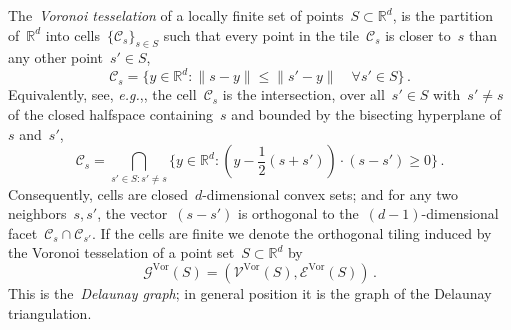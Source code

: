 \documentclass[12pt]{amsart}
\numberwithin{equation}{section}
\newcommand{\eg}{{\it e.g.}}
\newcommand*{\Rd}{\ensuremath{\mathbb{R}^d}}
\newcommand{\GVor}{\mathcal{G}^{\mathrm{Vor}}}
\newcommand{\VVor}{\mathcal{V}^{\mathrm{Vor}}}
\newcommand{\EVor}{\mathcal{E}^{\mathrm{Vor}}}
\begin{document}
The~\emph{Voronoi tesselation} of a locally finite set of points~$S \subset \Rd$, is the partition of~$\Rd$
into cells~$\{\mathcal{C}_s\}_{s \in S}$ such that every point in the tile~$\mathcal{C}_s$ is closer
to~$s$ than any other point~$s' \in S$, 
\[
\mathcal{C}_s = \{y \in \Rd: \|s - y\| \leq \|s' - y\| \quad \forall s' \in S  \} \, . 
\]
Equivalently, see, \eg ,\cite[Section 1]{mollerLectures}, the cell~$\mathcal{C}_s$ is the intersection, 
over all~$s'\in S$ with~$s' \neq s$ of the closed halfspace 
containing~$s$ and bounded by the bisecting hyperplane of~$s$ and~$s'$, 
\begin{equation}
	\label{eq:half-space-definition-of-cells}
	\mathcal{C}_s = \bigcap_{s' \in S : s' \neq s} \{ y \in \Rd:  (y - \frac{1}{2}(s + s')) \cdot (s-s') \geq 0 \} \, . 
\end{equation}
Consequently, cells are closed~$d$-dimensional convex sets; and for any two neighbors~$s,s'$, the
vector~$(s-s')$ is orthogonal to the~$(d-1)$-dimensional facet~$\mathcal{C}_s \cap \mathcal{C}_{s'}$.
If the cells are finite we denote the orthogonal tiling induced by the Voronoi tesselation of a point set~$S \subset \Rd$ by~
\begin{equation}
	\label{eq:voronoi-tiling-graph}
	\GVor(S) = (\VVor(S), \EVor(S)) \, .
\end{equation}
This is the~\emph{Delaunay graph}; in general position it is the graph of the Delaunay triangulation.
\end{document}
